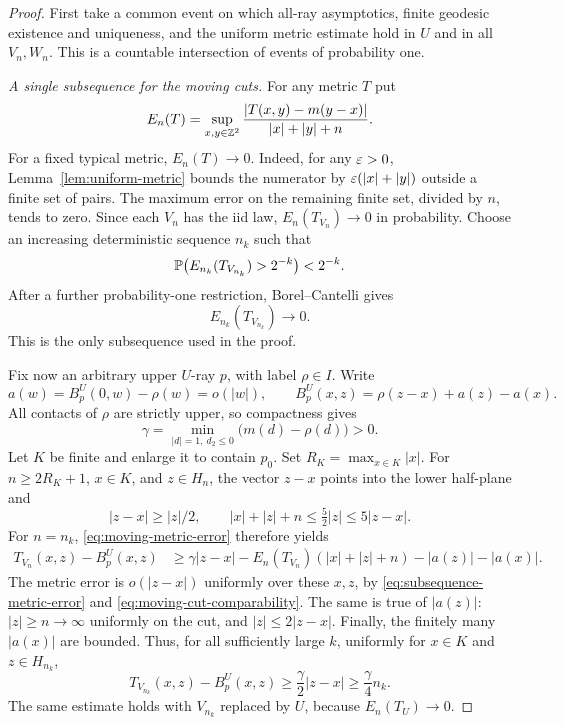 \begin{proof}
First take a common event on which all-ray asymptotics, finite
geodesic existence and uniqueness, and the uniform metric estimate
hold in $U$ and in all $V_n,W_n$.  This is a countable intersection
of events of probability one.

\emph{A single subsequence for the moving cuts.}
For any metric $T$ put
\begin{equation}
 E_n(T)=\sup_{x,y\in\mathbb Z^2}
 \frac{|T(x,y)-m(y-x)|}{|x|+|y|+n}.
 \label{eq:moving-metric-error}
\end{equation}
For a fixed typical metric, $E_n(T)\to0$.  Indeed, for any
$\varepsilon>0$, Lemma~\ref{lem:uniform-metric} bounds the numerator by
$\varepsilon(|x|+|y|)$ outside a finite set of pairs.  The maximum error
on the remaining finite set, divided by $n$, tends to zero.  Since
each $V_n$ has the iid law, $E_n(T_{V_n})\to0$ in probability.
Choose an increasing deterministic sequence $n_k$ such that
\[
 \mathbb P\bigl(E_{n_k}(T_{V_{n_k}})>2^{-k}\bigr)<2^{-k}.
\]
After a further probability-one restriction, Borel--Cantelli gives
\begin{equation}
 E_{n_k}(T_{V_{n_k}})\longrightarrow0.
 \label{eq:subsequence-metric-error}
\end{equation}
This is the only subsequence used in the proof.

Fix now an arbitrary upper $U$-ray $p$, with label $\rho\in I$.
Write
\begin{equation}
 a(w)=B_p^U(0,w)-\rho(w)=o(|w|),\qquad
 B_p^U(x,z)=\rho(z-x)+a(z)-a(x).
 \label{eq:rooted-busemann-error}
\end{equation}
All contacts of $\rho$ are strictly upper, so compactness gives
\begin{equation}
 \gamma=\min_{|d|=1,\ d_2\le0}\bigl(m(d)-\rho(d)\bigr)>0.
 \label{eq:opposite-semicircle-gap}
\end{equation}
Let $K$ be finite and enlarge it to contain $p_0$.  Set
$R_K=\max_{x\in K}|x|$.  For $n\ge2R_K+1$, $x\in K$, and
$z\in H_n$, the vector $z-x$ points into the lower half-plane and
\begin{equation}
 |z-x|\ge |z|/2,\qquad
 |x|+|z|+n\le \tfrac52|z|\le5|z-x|.
 \label{eq:moving-cut-comparability}
\end{equation}
For $n=n_k$, \eqref{eq:moving-metric-error} therefore yields
\begin{align}
 T_{V_n}(x,z)-B_p^U(x,z)
 &\ge \gamma|z-x|
      -E_n(T_{V_n})(|x|+|z|+n)-|a(z)|-|a(x)|.
 \label{eq:moving-cut-barrier-estimate}
\end{align}
The metric error is $o(|z-x|)$ uniformly over these $x,z$, by
\eqref{eq:subsequence-metric-error} and
\eqref{eq:moving-cut-comparability}.  The same is true of $|a(z)|$:
$|z|\ge n\to\infty$ uniformly on the cut, and
$|z|\le2|z-x|$.  Finally, the finitely many $|a(x)|$ are bounded.
Thus, for all sufficiently large $k$, uniformly for $x\in K$ and
$z\in H_{n_k}$,
\begin{equation}
 T_{V_{n_k}}(x,z)-B_p^U(x,z)
 \ge \frac\gamma2|z-x|\ge\frac\gamma4 n_k.
 \label{eq:moving-cut-positive-barrier}
\end{equation}
The same estimate holds with $V_{n_k}$ replaced by $U$, because
$E_n(T_U)\to0$.


\end{proof}
